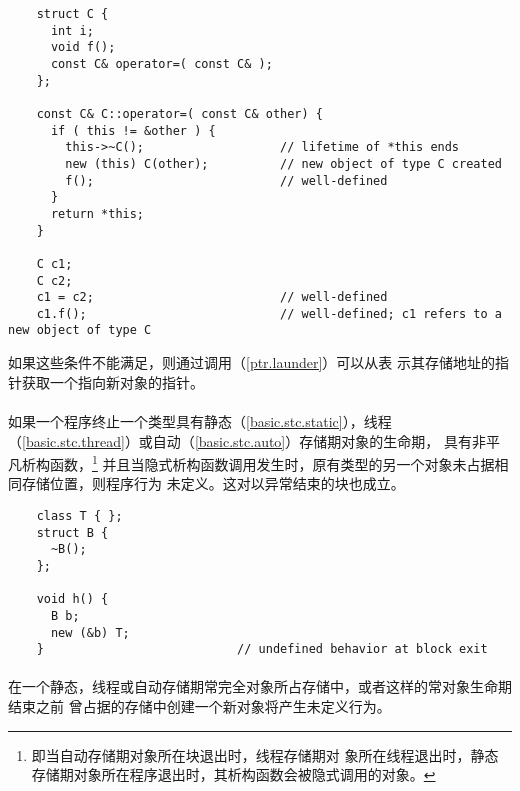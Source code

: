 \begin{example}
  \begin{lstlisting}
    struct C {
      int i;
      void f();
      const C& operator=( const C& );
    };

    const C& C::operator=( const C& other) {
      if ( this != &other ) {
        this->~C();                   // lifetime of *this ends
        new (this) C(other);          // new object of type C created
        f();                          // well-defined
      }
      return *this;
    }

    C c1;
    C c2;
    c1 = c2;                          // well-defined
    c1.f();                           // well-defined; c1 refers to a new object of type C
  \end{lstlisting}
\end{example}

\begin{note}
  如果这些条件不能满足，则通过调用（\ref{ptr.launder}）可以从表
  示其存储地址的指针获取一个指向新对象的指针。
\end{note}

\paragraph{} %
如果一个程序终止一个类型具有静态（\ref{basic.stc.static}），线程
（\ref{basic.stc.thread}）或自动（\ref{basic.stc.auto}）存储期对象的生命期，
具有非平凡析构函数，\footnote{即当自动存储期对象所在块退出时，线程存储期对
象所在线程退出时，静态存储期对象所在程序退出时，其析构函数会被隐式调用的对象。}
并且当隐式析构函数调用发生时，原有类型的另一个对象未占据相同存储位置，则程序行为
未定义。这对以异常结束的块也成立。

\begin{example}
  \begin{lstlisting}
    class T { };
    struct B {
      ~B();
    };

    void h() {
      B b;
      new (&b) T;
    }                           // undefined behavior at block exit
  \end{lstlisting}
\end{example}

\paragraph{} %
在一个静态，线程或自动存储期常完全对象所占存储中，或者这样的常对象生命期结束之前
曾占据的存储中创建一个新对象将产生未定义行为。

